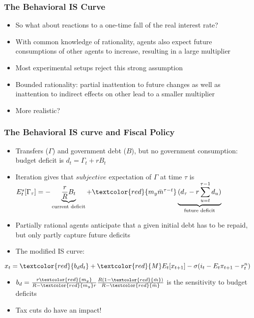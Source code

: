 \documentclass{beamer}
\begin{document}

\begin{frame}
\frametitle{The Behavioral IS Curve}
\begin{itemize}
\item So what about reactions to a one-time fall of the real interest rate?
\item With common knowledge of rationality, agents also expect future consumptions of other agents to increase, resulting in a large multiplier
\item Most experimental setups reject this strong assumption
\item Bounded rationality: partial inattention to future changes as well as inattention to indirect effects on other lead to a smaller multiplier
\item More realistic?
\end{itemize}
\end{frame}


\begin{frame}
\frametitle{The Behavioral IS curve and Fiscal Policy}
\begin{itemize}
\item Transfers ($\Gamma$) and government debt ($B$), but no government consumption: budget deficit is $d_ {t}=\Gamma_{t}+rB_{t}$
\item Iteration gives that $subjective$ expectation of $\Gamma$ at time $\tau$ is $E_{t}^{s}[\Gamma_{\tau}]=-\underbrace{\frac {r}{R}B_{t}}_\text{current deficit}+\textcolor{red}{m_{y}\bar m^{\tau-t}}\underbrace{(d_{\tau}-r \sum_{u=t}^{\tau-1}d_{u})}_\text{future deficit}$
\item Partially rational agents anticipate that a given initial debt has to be repaid, but only partly capture future deficits
\item The modified IS curve:

\end{itemize}
	$$x_{t}=\textcolor{red}{b_{d}d_{t}}+\textcolor{red}{M}E_{t}[x_{t+1}]-\sigma(i_{t}-E_{t}\pi_{t+1}-r_{t}^{n})$$
\begin{itemize}
 \item $b_{d}=\frac {r\textcolor{red}{m_{y}}}{R-\textcolor{red}{m_{y}}r}\frac {R(1-\textcolor{red}{\bar m})}{R-\textcolor{red}{\bar m}}$ is the sensitivity to budget deficits
 \item Tax cuts do have an impact!
\end{itemize}
\end{frame}
\end{document}
